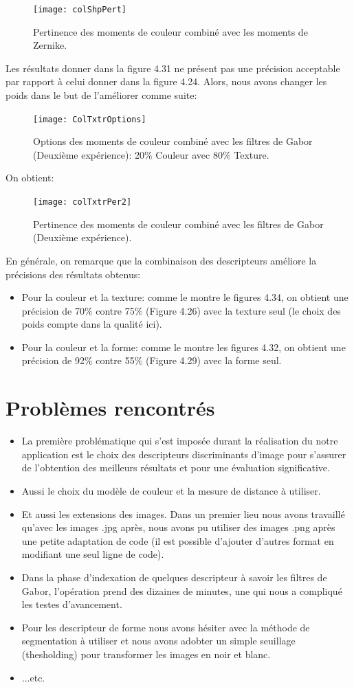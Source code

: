 \begin{figure}[H]
	\centering
	\texttt{[image: colShpPert]} 
	\caption{Pertinence des moments de couleur combiné avec les moments de Zernike.}
\end{figure}
Les résultats donner dans la figure 4.31 ne présent pas une précision acceptable par rapport à celui donner dans la figure 4.24. Alors, nous avons changer les poids dans le but de l'améliorer comme suite:
\begin{figure}[H]
	\centering
	\texttt{[image: ColTxtrOptions]}
	\caption{Options des moments de couleur combiné avec les filtres de Gabor (Deuxième expérience):
		20\% Couleur avec 80\% Texture.}
\end{figure}
On obtient:
\begin{figure}[H]
	\centering
	\texttt{[image: colTxtrPer2]} 
	\caption{Pertinence des moments de couleur combiné avec les filtres de Gabor (Deuxième expérience).}
\end{figure}

En générale, on remarque que la combinaison des descripteurs améliore la précisions des résultats obtenus:
\begin{itemize}
	\item Pour la couleur et la texture: comme le montre le figures 4.34, on obtient une précision de 70\% contre  75\% (Figure 4.26) avec la texture seul (le choix des poids compte dans la qualité ici).
	\item Pour la couleur et la forme: comme le montre les figures 4.32, on obtient une précision de 92\% contre  55\% (Figure 4.29) avec la forme seul.
\end{itemize}
\section{Problèmes rencontrés}
\begin{itemize}
	\item La première problématique qui s’est imposée durant la réalisation du notre
	application est le choix des descripteurs discriminants d’image pour s’assurer de
	l’obtention des meilleurs résultats et pour une évaluation significative.
	\item Aussi le choix du modèle de couleur et la mesure de distance à utiliser.
	
	\item Et aussi les extensions des images. Dans un premier lieu nous avons travaillé
	qu’avec les images .jpg après, nous avons pu utiliser des images .png après une
	petite adaptation de code (il est possible d'ajouter d'autres format en modifiant une seul ligne de code).
	
	\item Dans la phase d'indexation de quelques descripteur à savoir les filtres de Gabor, l'opération prend des dizaines de minutes, une qui nous a compliqué les testes d'avancement.
	\item Pour les descripteur de forme nous avons hésiter avec la méthode de segmentation à utiliser et nous avons adobter un simple seuillage (thesholding) pour transformer les images en noir et blanc.
	\item ...etc.
\end{itemize}
